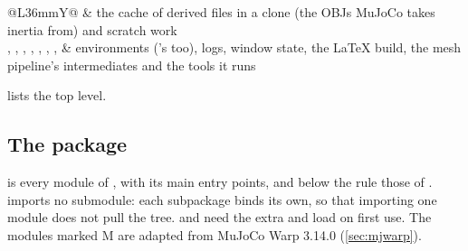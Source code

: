 \begin{table}[t]
\begin{tabularx}{\linewidth}{@{}L{36mm}Y@{}}
 & the cache of derived files in a clone (the OBJs MuJoCo takes inertia from) and scratch work \\
, , , , , , ,  & environments ('s too), logs, window state, the LaTeX build, the mesh pipeline's intermediates and the tools it runs \\
\bottomrule
\end{tabularx}
\end{table}

 lists the top level.

\subsection{The package}\label{sec:package}

 is every module of , with its main entry points, and below the rule those of .  imports no submodule: each subpackage binds its own, so that importing one module does not pull the tree.  and  need the  extra and load on first use. The modules marked M are adapted from MuJoCo Warp 3.14.0 (\cref{sec:mjwarp}).

